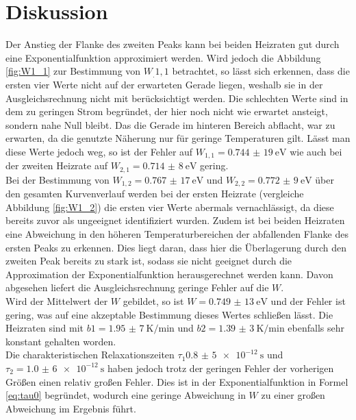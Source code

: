 
\section{Diskussion}
\label{sec:Diskussion}

Der Anstieg der Flanke des zweiten Peaks kann bei beiden Heizraten gut durch eine Exponentialfunktion approximiert werden. Wird jedoch die Abbildung \ref{fig:W1_1} zur Bestimmung von $W_.{1,1}$ betrachtet, so lässt sich erkennen, dass die ersten vier Werte nicht auf der erwarteten Gerade liegen, weshalb sie in der Ausgleichsrechnung nicht mit berücksichtigt werden. Die schlechten Werte sind in dem zu geringen Strom begründet, der hier noch nicht wie erwartet ansteigt, sondern nahe Null bleibt. Das die Gerade im hinteren Bereich abflacht, war zu erwarten, da die genutzte Näherung nur für geringe Temperaturen gilt. Lässt man diese Werte jedoch weg, so ist der Fehler auf $W_{1,1}=\SI{0,744(19)}{\electronvolt}$ wie auch bei der zweiten Heizrate auf $W_{2,1}=\SI{0,714(8)}{\electronvolt}$ gering.\\
Bei der Bestimmung von $W_{1,2}=\SI{0,767(17)}{\electronvolt}$ und $W_{2,2}=\SI{0,772(9)}{\electronvolt}$ über den gesamten Kurvenverlauf werden bei der ersten Heizrate (vergleiche Abbildung \ref{fig:W1_2}) die ersten vier Werte abermals vernachlässigt, da diese bereits zuvor als ungeeignet identifiziert wurden. Zudem ist bei beiden Heizraten eine Abweichung in den höheren Temperaturbereichen der abfallenden Flanke des ersten Peaks zu erkennen. Dies liegt daran, dass hier die Überlagerung durch den zweiten Peak bereits zu stark ist, sodass sie nicht geeignet durch die Approximation der Exponentialfunktion herausgerechnet werden kann. Davon abgesehen liefert die Ausgleichsrechnung geringe Fehler auf die $W$.\\
Wird der Mittelwert der $W$ gebildet, so ist $W=\SI{0,749(13)}{\electronvolt}$ und der Fehler ist gering, was auf eine akzeptable Bestimmung dieses Wertes schließen lässt. Die Heizraten sind mit $b1=\SI{1,95(7)}{\kelvin\per\minute}$ und $b2=\SI{1,39(3)}{\kelvin\per\minute}$ ebenfalls sehr konstant gehalten worden.\\
Die charakteristischen Relaxationszeiten $\tau_1\SI{0,8(5)e-12}{\second}$ und $\tau_2=\SI{1,0(6)e-12}{\second}$ haben jedoch trotz der geringen Fehler der vorherigen Größen einen relativ großen Fehler. Dies ist in der Exponentialfunktion in Formel \eqref{eq:tau0} begründet, wodurch eine geringe Abweichung in $W$ zu einer großen Abweichung im Ergebnis führt.